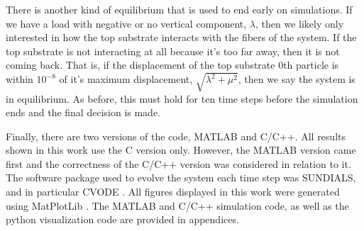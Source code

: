    There is another kind of equilibrium that is used to end early on simulations. If we have a load with negative or no vertical component, $\lambda$, then we likely only interested in how the top substrate interacts with the fibers of the system. If the top substrate is not interacting at all because it's too far away, then it is not coming back. That is, if the displacement of the top substrate $0$th particle is within $10^{-8}$ of it's maximum displacement, $\sqrt{\lambda^2 + \mu^2}$, then we say the system is in equilibrium. As before, this must hold for ten time steps before the simulation ends and the final decision is made.

   Finally, there are two versions of the code, MATLAB \cite{MATLAB2010} and C/C++. All results shown in this work use the C version only. However, the MATLAB version came first and the correctness of the C/C++ version was considered in relation to it. The software package used to evolve the system each time step was SUNDIALS, and in particular CVODE \cite{sundials}. All figures displayed in this work were generated using MatPlotLib \cite{Hunter2007}. The MATLAB and C/C++ simulation code, as well as the python visualization code are provided in appendices.
